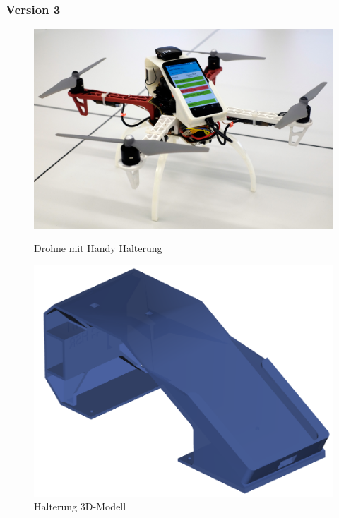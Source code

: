 \subsubsection{Version 3}
\begin{figure}[H]
	\centering
	\begin{minipage}[b]{0.45\textwidth}
		\centering
		\includegraphics[width=\textwidth]{images/drone2.jpg}
		\caption{Drohne mit Handy Halterung}
		\label{fig:prototyp-3}
	\end{minipage}
	\hfill
	\begin{minipage}[b]{0.35\textwidth}
		\centering
		\includegraphics[width=\textwidth]{images/hardware/case-model.png}
		\caption{Halterung 3D-Modell}
		\label{fig:case-model}
	\end{minipage}
\end{figure}

